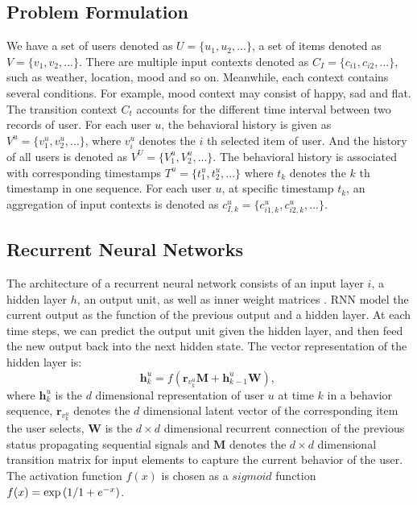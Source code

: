 \documentclass{sig-alternate}
\begin{document}
\subsection{Problem Formulation}
We have a set of users denoted as $U  = \{ u_1 ,u_2 ,...\}$, a set of items denoted as $V  = \{ v_1 ,v_2 ,...\}$. There are multiple input contexts denoted as $C_I = \{c_{i1} ,c_{i2} ,...\}$, such as weather, location, mood and so on. Meanwhile, each context contains several conditions. For example, mood context may consist of happy, sad and flat. The transition context $C_t$ accounts for the different time interval between two records of user. For each user $u$, the behavioral history is given as $V^u = \{v^u_{1}, v^u_{2}, ...\}$, where $v^u_{i}$ denotes the $i$ th selected item of user. And the history of all users is denoted as $V^U = \{V^u_{1}, V^u_{2}, ...\}$. The behavioral history is associated with corresponding timestamps $T^u = \{t^u_{1}, t^u_{2}, ...\}$ where $t_k$ denotes the $k$ th timestamp in one sequence. For each user $u$, at specific timestamp $t_k$, an aggregation of input contexts is denoted as $c_{I,k}^{u} = \{
c_{i1,k}^{u},c_{i2,k}^{u},...\}$.







\subsection{ Recurrent Neural Networks}
The architecture of a recurrent neural network consists of an input layer $i$, a hidden layer $h$, an output unit, as well as inner weight matrices \cite{zhang2014sequential}. RNN model the current output as the function of the previous output and a hidden layer. At each time steps, we can predict the output unit given the hidden layer, and then feed the new output back into the next hidden state. The vector representation of the hidden layer is:
\begin{equation}  \label{eqHoriginal}
\mathbf{h}_{k}^{u}=f\left ( {\mathbf{r}_{v_{k}^{u}}}\mathbf{M}+\mathbf{h}_{k-1}^{u}\mathbf{W} \right),~
\end{equation}
where $\mathbf{h}^u_{k}$ is the $d$ dimensional representation of  user $u$ at time $k$ in a behavior sequence, $\mathbf{r}_{v_{k}^{u}}$ denotes the $d$ dimensional latent vector of the corresponding item the user selects, $\mathbf{W}$ is the $d \times d$ dimensional recurrent connection of the previous status propagating sequential signals and $\mathbf{M}$ denotes the $d \times d$ dimensional transition matrix for input elements to capture the current behavior of the user. The activation function $f(x)$ is chosen as a $sigmoid$ function $f(x) = \exp \left( {1 \mathord{\left/ \right. \kern-\nulldelimiterspace} 1 + e^{ - x} } \right)$.
\end{document}
